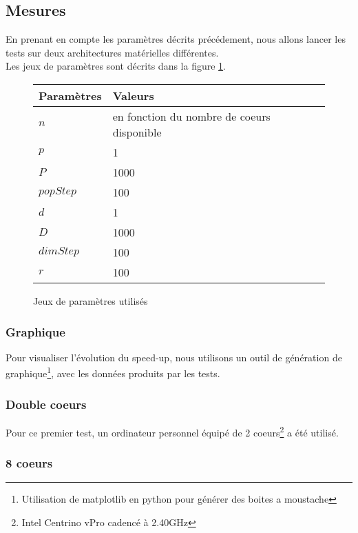 \subsection{Mesures}

En prenant en compte les paramètres décrits précédement, nous allons lancer les tests sur deux architectures matérielles différentes.\\

Les jeux de paramètres sont décrits dans la figure \ref{fig:jeux_parametres}.

\begin{figure}[here]
  \centering
  \begin{tabular}{ | l | p{7cm} |}
    \hline
    \textbf{Paramètres} & \textbf{Valeurs}\\\hline
    $n$ & en fonction du nombre de coeurs disponible\\\hline
    $p$ & 1\\\hline
    $P$ & 1000\\\hline
    $popStep$ & 100\\\hline
    $d$ & 1\\\hline
    $D$ & 1000\\\hline
    $dimStep$ & 100\\\hline
    $r$ & 100\\\hline
  \end{tabular}
  \caption{Jeux de paramètres utilisés}
  \label{fig:jeux_parametres}
\end{figure}

\subsubsection{Graphique}

Pour visualiser l'évolution du speed-up, nous utilisons un outil de génération de graphique\footnote{Utilisation de matplotlib en python pour générer des boites a moustache}, avec les données produits par les tests.

\subsubsection{Double coeurs}

Pour ce premier test, un ordinateur personnel équipé de 2 coeurs\footnote{Intel Centrino vPro cadencé à 2.40GHz} a été utilisé.

\subsubsection{8 coeurs}

